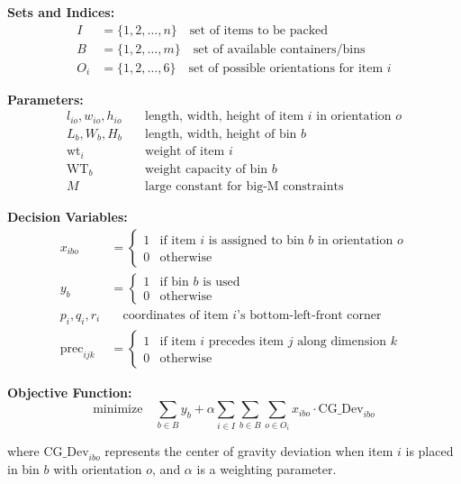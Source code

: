 \documentclass{article}
\begin{document}
\textbf{Sets and Indices:}
\begin{align}
I &= \{1, 2, \ldots, n\} \quad \text{set of items to be packed}\\
B &= \{1, 2, \ldots, m\} \quad \text{set of available containers/bins}\\
O_i &= \{1, 2, \ldots, 6\} \quad \text{set of possible orientations for item } i
\end{align}

\textbf{Parameters:}
\begin{align}
l_{io}, w_{io}, h_{io} &\quad \text{length, width, height of item } i \text{ in orientation } o\\
L_b, W_b, H_b &\quad \text{length, width, height of bin } b\\
\text{wt}_i &\quad \text{weight of item } i\\
\text{WT}_b &\quad \text{weight capacity of bin } b\\
M &\quad \text{large constant for big-M constraints}
\end{align}

\textbf{Decision Variables:}
\begin{align}
x_{ibo} &= \begin{cases} 1 & \text{if item } i \text{ is assigned to bin } b \text{ in orientation } o \\ 0 & \text{otherwise} \end{cases}\\
y_b &= \begin{cases} 1 & \text{if bin } b \text{ is used} \\ 0 & \text{otherwise} \end{cases}\\
p_{i}, q_{i}, r_{i} &\quad \text{coordinates of item } i\text{'s bottom-left-front corner}\\
\text{prec}_{ijk} &= \begin{cases} 1 & \text{if item } i \text{ precedes item } j \text{ along dimension } k \\ 0 & \text{otherwise} \end{cases}
\end{align}

\textbf{Objective Function:}
\begin{equation}
\text{minimize} \quad \sum_{b \in B} y_b + \alpha \sum_{i \in I} \sum_{b \in B} \sum_{o \in O_i} x_{ibo} \cdot \text{CG\_Dev}_{ibo}
\end{equation}

where $\text{CG\_Dev}_{ibo}$ represents the center of gravity deviation when item $i$ is placed in bin $b$ with orientation $o$, and $\alpha$ is a weighting parameter.
\end{document}

